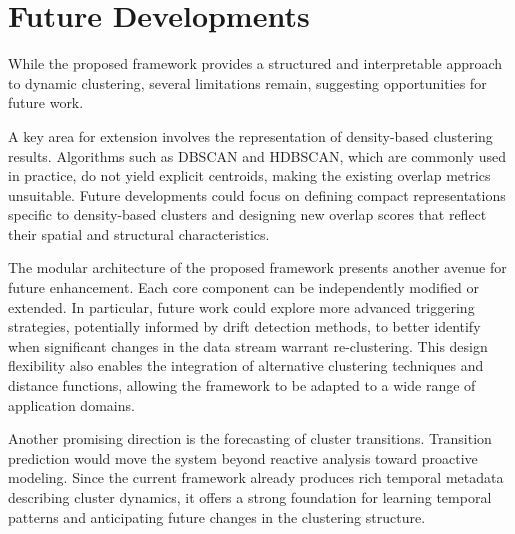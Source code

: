 \section{Future Developments}\label{sec:future_developments}

While the proposed framework provides a structured and interpretable approach
to dynamic clustering, several limitations remain, suggesting opportunities for
future work.

A key area for extension involves the representation of density-based
clustering results. Algorithms such as DBSCAN and HDBSCAN, which are commonly
used in practice, do not yield explicit centroids, making the existing overlap
metrics unsuitable. Future developments could focus on defining compact
representations specific to density-based clusters and designing new overlap
scores that reflect their spatial and structural characteristics.

The modular architecture of the proposed framework presents another avenue for
future enhancement. Each core component can be independently modified or
extended. In particular, future work could explore more advanced triggering
strategies, potentially informed by drift detection methods, to better identify
when significant changes in the data stream warrant re-clustering. This design
flexibility also enables the integration of alternative clustering techniques
and distance functions, allowing the framework to be adapted to a wide range of
application domains.

Another promising direction is the forecasting of cluster transitions.
Transition prediction would move the system beyond reactive analysis toward
proactive modeling. Since the current framework already produces rich temporal
metadata describing cluster dynamics, it offers a strong foundation for
learning temporal patterns and anticipating future changes in the clustering
structure.

